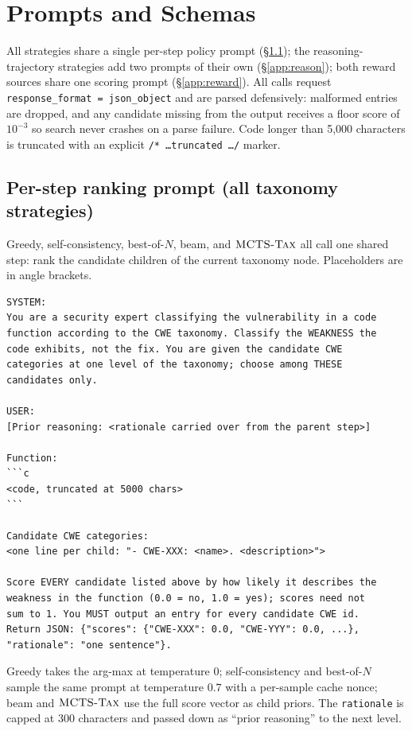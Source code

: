 \section{Prompts and Schemas}
\label{app:prompts}

All strategies share a single per-step policy prompt (\S\ref{app:rank}); the
reasoning-trajectory strategies add two prompts of their own
(\S\ref{app:reason}); both reward sources share one scoring prompt
(\S\ref{app:reward}). All calls request \texttt{response\_format
= json\_object} and are parsed defensively: malformed entries are dropped, and
any candidate missing from the output receives a floor score of $10^{-3}$ so
search never crashes on a parse failure. Code longer than 5{,}000 characters is
truncated with an explicit \texttt{/* \ldots truncated \ldots */} marker.

\subsection{Per-step ranking prompt (all taxonomy strategies)}
\label{app:rank}

Greedy, self-consistency, best-of-$N$, beam, and $\textsc{MCTS-Tax}$ all call one shared
step: rank the candidate children of the current taxonomy node. Placeholders are
in angle brackets.

\begin{lstlisting}
SYSTEM:
You are a security expert classifying the vulnerability in a code
function according to the CWE taxonomy. Classify the WEAKNESS the
code exhibits, not the fix. You are given the candidate CWE
categories at one level of the taxonomy; choose among THESE
candidates only.

USER:
[Prior reasoning: <rationale carried over from the parent step>]

Function:
```c
<code, truncated at 5000 chars>
```

Candidate CWE categories:
<one line per child: "- CWE-XXX: <name>. <description>">

Score EVERY candidate listed above by how likely it describes the
weakness in the function (0.0 = no, 1.0 = yes); scores need not
sum to 1. You MUST output an entry for every candidate CWE id.
Return JSON: {"scores": {"CWE-XXX": 0.0, "CWE-YYY": 0.0, ...},
"rationale": "one sentence"}.
\end{lstlisting}

Greedy takes the arg-max at temperature $0$; self-consistency and best-of-$N$
sample the same prompt at temperature $0.7$ with a per-sample cache nonce;
beam and $\textsc{MCTS-Tax}$ use the full score vector as child priors. The
\texttt{rationale} is capped at 300 characters and passed down as ``prior
reasoning'' to the next level.

